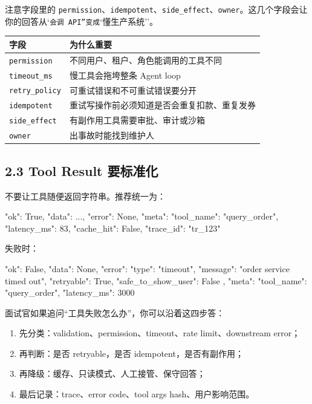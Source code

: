 注意字段里的 \texttt{permission}、\texttt{idempotent}、\texttt{side\_effect}、\texttt{owner}。这几个字段会让你的回答从`\texttt{会调 API''变成}`懂生产系统''。


\begingroup
\scriptsize
\setlength{\tabcolsep}{3pt}
\begin{longtable}{|p{}|p{}|}
\hline
字段 & 为什么重要 \\ \hline
\texttt{permission} & 不同用户、租户、角色能调用的工具不同 \\ \hline
\texttt{timeout\_ms} & 慢工具会拖垮整条 Agent loop \\ \hline
\texttt{retry\_policy} & 可重试错误和不可重试错误要分开 \\ \hline
\texttt{idempotent} & 重试写操作前必须知道是否会重复扣款、重复发券 \\ \hline
\texttt{side\_effect} & 有副作用工具需要审批、审计或沙箱 \\ \hline
\texttt{owner} & 出事故时能找到维护人 \\ \hline
\end{longtable}
\endgroup

\subsection{2.3 Tool Result 要标准化}

不要让工具随便返回字符串。推荐统一为：


\begin{codeblock}
{
    "ok": True,
    "data": {...},
    "error": None,
    "meta": {
        "tool_name": "query_order",
        "latency_ms": 83,
        "cache_hit": False,
        "trace_id": "tr_123"
    }
}
\end{codeblock}

失败时：


\begin{codeblock}
{
    "ok": False,
    "data": None,
    "error": {
        "type": "timeout",
        "message": "order service timed out",
        "retryable": True,
        "safe_to_show_user": False
    },
    "meta": {
        "tool_name": "query_order",
        "latency_ms": 3000
    }
}
\end{codeblock}

面试官如果追问``工具失败怎么办''，你可以沿着这四步答：


\begin{enumerate}[leftmargin=2em]
\item 先分类：validation、permission、timeout、rate limit、downstream error；
\item 再判断：是否 retryable，是否 idempotent，是否有副作用；
\item 再降级：缓存、只读模式、人工接管、保守回答；
\item 最后记录：trace、error code、tool args hash、用户影响范围。
\end{enumerate}

